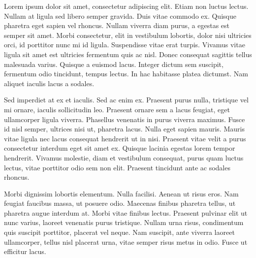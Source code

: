 
Lorem ipsum dolor sit amet, consectetur adipiscing elit. Etiam non luctus lectus. Nullam at ligula sed libero semper gravida. Duis vitae commodo ex. Quisque pharetra eget sapien vel rhoncus. Nullam viverra diam purus, a egestas est semper sit amet. Morbi consectetur, elit in vestibulum lobortis, dolor nisi ultricies orci, id porttitor nunc mi id ligula. Suspendisse vitae erat turpis. Vivamus vitae ligula sit amet est ultricies fermentum quis ac nisl. Donec consequat sagittis tellus malesuada varius. Quisque a euismod lacus. Integer dictum sem suscipit, fermentum odio tincidunt, tempus lectus. In hac habitasse platea dictumst. Nam aliquet iaculis lacus a sodales.

Sed imperdiet at ex et iaculis. Sed ac enim ex. Praesent purus nulla, tristique vel mi ornare, iaculis sollicitudin leo. Praesent ornare sem a lacus feugiat, eget ullamcorper ligula viverra. Phasellus venenatis in purus viverra maximus. Fusce id nisl semper, ultrices nisi ut, pharetra lacus. Nulla eget sapien mauris. Mauris vitae ligula nec lacus consequat hendrerit ut in nisi. Praesent vitae velit a purus consectetur interdum eget sit amet ex. Quisque lacinia egestas lorem tempor hendrerit. Vivamus molestie, diam et vestibulum consequat, purus quam luctus lectus, vitae porttitor odio sem non elit. Praesent tincidunt ante ac sodales rhoncus.

Morbi dignissim lobortis elementum. Nulla facilisi. Aenean ut risus eros. Nam feugiat faucibus massa, ut posuere odio. Maecenas finibus pharetra tellus, ut pharetra augue interdum at. Morbi vitae finibus lectus. Praesent pulvinar elit ut nunc varius, laoreet venenatis purus tristique. Nullam urna risus, condimentum quis suscipit porttitor, placerat vel neque. Nam suscipit, ante viverra laoreet ullamcorper, tellus nisl placerat urna, vitae semper risus metus in odio. Fusce ut efficitur lacus.